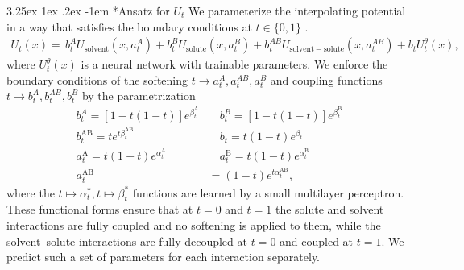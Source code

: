 \documentclass[%
onecolumn,
superscriptaddress,
nofootinbib,
amsmath,amssymb,
table
]{revtex4-2}
\makeatletter
\renewcommand\paragraph{%
  \@startsection{paragraph}{4}{\z@}%
    {3.25ex \@plus1ex \@minus.2ex}%
    {-1em}%
    {\normalfont\normalsize\bfseries}%
}
\makeatother
\begin{document}
\paragraph*{Ansatz for $U_t$}
We parameterize the interpolating potential in a way that satisfies the boundary conditions at $t \in \{0,1\}$ \citep{mate2023learning}.
\begin{align}
    \label{eq:ansatz}
    U_t(x) = \, b_t^A U_{\mathrm{solvent}}(x,a_t^A) 
    + b_t^B U_{\mathrm{solute}}(x,a_t^B) 
    +b^{AB}_t U_{\mathrm{solvent-solute}}(x,a^{AB}_t)
    +b_t U_t^\theta(x),
\end{align}
where  $U_t^\theta(x)$ is a neural network with trainable parameters. We enforce the boundary conditions of the softening $t \rightarrow a_t^A,a^{AB}_t,a_t^B$  and  coupling functions $t \rightarrow b_t^A,b^{AB}_t,b_t^B$ by the parametrization
\begin{align}
    b_t^{A} = [1-t(1-t)]e^{\beta_t^{\mathrm{A}}}& \quad 
    b_t^{B} = [1-t(1-t)]e^{\beta_t^{\mathrm{B}}} \\
    b_t^{\mathrm{AB}} = te^{t\beta_t^{\mathrm{AB}}}&  \quad
    b_t = t(1-t)e^{\beta_t} \\
    a_t^{\mathrm{A}} = t(1-t)e^{\alpha_t^{\mathrm{A}}}& \quad 
    a_t^{\mathrm{B}} = t(1-t)e^{\alpha_t^{\mathrm{B}}} \\
    a_t^{\mathrm{AB}} &= (1-t)e^{t\alpha_t^{\mathrm{AB}}}, 
\end{align}
where the $t\mapsto \alpha_t^*,t\mapsto \beta_t^*$ functions are learned by a small multilayer perceptron. 
These functional forms ensure that  at $t=0$ and $t=1$ the solute and solvent interactions are fully coupled and no softening is applied to them, while the solvent--solute interactions are fully decoupled at $t=0$ and coupled at $t=1$. We predict such a set of parameters for each interaction separately.
\end{document}
